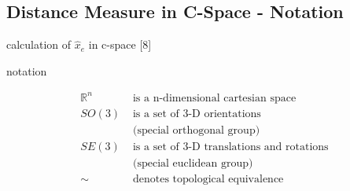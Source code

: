 \documentclass[%
  professionalfonts,%
  xcolor={%
    usenames,%
    dvipsnames,%
    svgnames,%
    table,%
    hyperref%
  }%
]{beamer}
\begin{document}
\subsection{Distance Measure in C-Space - Notation}
\begin{frame}
calculation of $\hat{x}_{e}$ in c-space [8]

notation

\begin{align*}
\mathbb{R}^{n} & \text{ is a n-dimensional cartesian space} \\
SO(3) & \text{ is a set of 3-D orientations} \\
& \text{ (special orthogonal group)} \\
SE(3) & \text{ is a set of 3-D translations and rotations} \\
& \text{ (special euclidean group)} \\
\sim & \text{ denotes topological equivalence}
\end{align*}

\end{frame}
\end{document}
